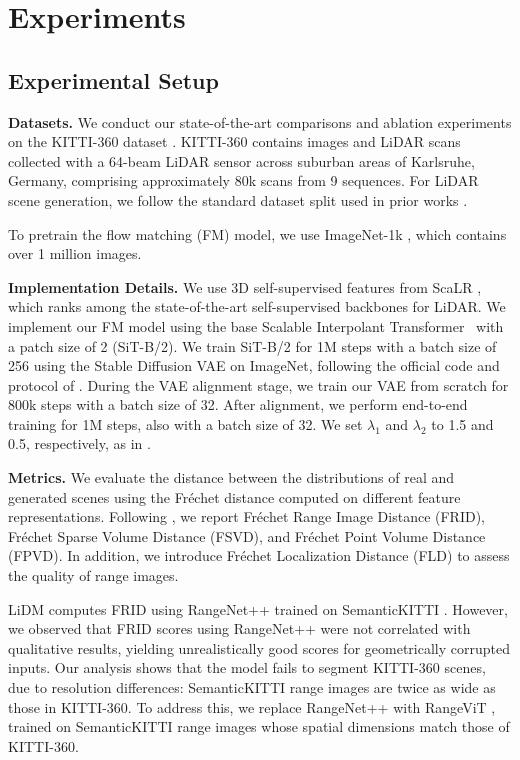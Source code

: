 \section{Experiments}
\label{sec:experiments}


\subsection{Experimental Setup}
\textbf{Datasets.} We conduct our state-of-the-art comparisons and ablation experiments on the KITTI-360 dataset \cite{liao2022kitti}. 
KITTI-360 contains images and LiDAR scans collected with a 64-beam LiDAR sensor across suburban areas of Karlsruhe, Germany, comprising approximately 80k scans from 9 sequences. 
For LiDAR scene generation, we follow the standard dataset split used in prior works \cite{zyrianov2022learning, nakashima_lidar_2024, nakashima_fast_2025}.  

To pretrain the flow matching (FM) model, we use ImageNet-1k \cite{liao2022kitti}, which contains over 1 million images.

\textbf{Implementation Details.}
We use 3D self-supervised features from ScaLR \cite{puy2024three}, which ranks among the state-of-the-art self-supervised backbones for LiDAR.
We implement our FM model using the base Scalable Interpolant Transformer~\cite{ma_sit_2024} with a patch size of 2 (SiT-B/2).
We train SiT-B/2 for 1M steps with a batch size of 256 using the Stable Diffusion VAE on ImageNet, following the official code and protocol of \cite{leng_repa-e_2025}.
During the VAE alignment stage, we train our VAE from scratch for 800k steps with a batch size of 32. After alignment, we perform end-to-end training for 1M steps, also with a batch size of 32. 
We set $\lambda_1$ and $\lambda_2$ to 1.5 and 0.5, respectively, as in \cite{wang_repa_2025}.
 
\textbf{Metrics.}  We evaluate the distance between the distributions of real and generated scenes using the Fr\'echet distance computed on different feature representations. 
Following \cite{ran_towards_2024}, we report Fr\'echet Range Image Distance (FRID), Fr\'echet Sparse Volume Distance (FSVD), and Fr\'echet Point Volume Distance (FPVD). 
In addition, we introduce Fréchet Localization Distance (FLD) to assess the quality of range images. 

LiDM \cite{ran_towards_2024} computes FRID using RangeNet++ \cite{milioto_rangenet_2019} trained on SemanticKITTI \cite{behley2019iccv}. 
However, we observed that FRID scores using RangeNet++ were not correlated with qualitative results, yielding unrealistically good scores for geometrically corrupted inputs. Our analysis shows that the model fails to segment KITTI-360 scenes, due to resolution differences: SemanticKITTI range images are twice as wide as those in KITTI-360. To address this, we replace RangeNet++ with RangeViT \cite{ando_rangevit_2023}, trained on SemanticKITTI range images whose spatial dimensions match those of KITTI-360. 

